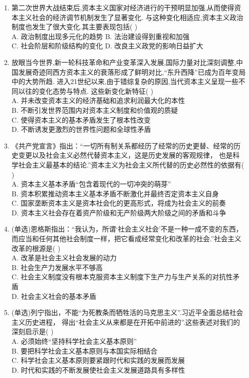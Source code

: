 \documentclass[12pt, a4paper, oneside, UTF8]{ctexbook}
\begin{document}
\begin{enumerate}
    \item 第二次世界大战结束后,资本主义国家对经济进行的干预明显加强,从而使得资本主义社会的经济调节机制发生了显著变化.
    与这种变化相适应,资本主义政治制度也发生了很大变化.其主要表现包括(   ) \\
    A. 政治制度出现多元化的趋势 \qquad
    B. 法治建设得到重视和加强 \\
    C. 社会阶层和阶级结构的变化 \qquad
    D. 改良主义政党的影响日益扩大

    \item 放眼当今世界,新一轮科技革命和产业变革深入发展,国际力量对比深刻调整,中国发展奇迹同西方资本主义的衰落形成了鲜明对比,“东升西降”已成为百年变局中的大势所趋.
    进入21世纪以来,由于错综复杂的原因,当代资本主义呈现一些不同以往的变化态势与特点.
    这些新变化新特征(   ) \\
    A. 并未改变资本主义的经济基础和追求利润最大化的本性\\
    B. 不断引发世界范围内对资本主义制度和价值观的质疑\\
    C. 使得资本主义的基本矛盾发生了根本性改变\\
    D. 不断诱发更激烈的世界性问题和全球性矛盾

    \item 《共产党宣言》指出：“一切所有制关系都经历了经常的历史更替、经常的历史变更以及社会主义必然代替资本主义，这是历史发展的客观规律，
    也是科学社会主义最基本的结论.”资本主义为社会主义所代替的历史必然性的依据有(   ) \\
    A. 资本主义基本矛盾“包含着现代的一切冲突的萌芽” \\
    B. 资本积累推动资本主义基本矛盾不断激化并最终否定资本主义自身 \\
    C. 国家垄断资本主义是资本社会化的更高形式，将成为社会主义的前奏 \\
    D. 资本主义社会存在着资产阶级和无产阶级两大阶级之间的矛盾和斗争

    \item (单选)恩格斯指出：“我认为，所谓‘社会主义社会’不是一种一成不变的东西，
    而应当和任何其他社会制度一样，把它看成经常变化和改革的社会.”社会主义改革的根源是(   ) \\
    A. 改革是社会主义社会发展的动力 \\
    B. 社会生产力发展水平不够高 \\
    C. 社会主义制度没有根本克服资本主义制度下生产力与生产关系的对抗性矛盾 \\
    D. 社会主义社会的基本矛盾 

    \item (单选)列宁指出，不能“为死教条而牺牲活的马克思主义”.习近平全面总结社会主义历史进程，
    得出“社会主义从来都是在开拓中前进的”.这些表述对我们的深刻启示是(   ) \\
    A. 必须始终“坚持科学社会主义基本原则” \\
    B. 要把科学社会主义基本原则与本国实际相结合 \\
    C. 科学社会主义基本原则要紧跟时代和实践的发展而发展 \\
    D. 时代和实践的不断发展使社会主义发展道路具有多样性


\end{enumerate}
\end{document}
